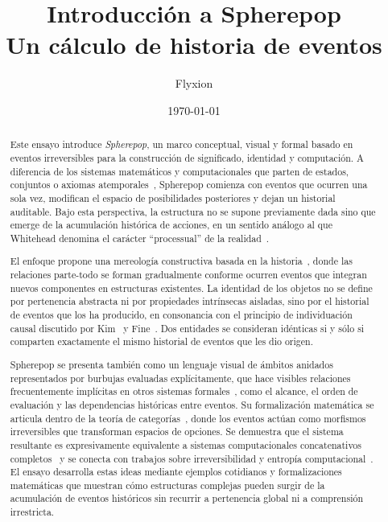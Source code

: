 \documentclass[12pt]{article}
\title{Introducción a Spherepop\\
\large Un cálculo de historia de eventos}
\author{Flyxion}
\date{\today}
\theoremstyle{plain}
\theoremstyle{definition}
\begin{document}
\maketitle
\thispagestyle{empty}

\begin{abstract}
\footnotesize
\noindent
Este ensayo introduce \emph{Spherepop}, un marco conceptual, visual y formal basado en eventos irreversibles para la construcción de significado, identidad y computación. A diferencia de los sistemas matemáticos y computacionales que parten de estados, conjuntos o axiomas atemporales~\cite{barendregt,homotopy}, Spherepop comienza con eventos que ocurren una sola vez, modifican el espacio de posibilidades posteriores y dejan un historial auditable. Bajo esta perspectiva, la estructura no se supone previamente dada sino que emerge de la acumulación histórica de acciones, en un sentido análogo al que Whitehead denomina el carácter ``processual'' de la realidad~\cite{whitehead}.

El enfoque propone una mereología constructiva basada en la historia~\cite{simons}, donde las relaciones parte-todo se forman gradualmente conforme ocurren eventos que integran nuevos componentes en estructuras existentes. La identidad de los objetos no se define por pertenencia abstracta ni por propiedades intrínsecas aisladas, sino por el historial de eventos que los ha producido, en consonancia con el principio de individuación causal discutido por Kim~\cite{kim} y Fine~\cite{fine}. Dos entidades se consideran idénticas si y sólo si comparten exactamente el mismo historial de eventos que les dio origen.

Spherepop se presenta también como un lenguaje visual de ámbitos anidados representados por burbujas evaluadas explícitamente, que hace visibles relaciones frecuentemente implícitas en otros sistemas formales~\cite{girard,abramsky}, como el alcance, el orden de evaluación y las dependencias históricas entre eventos. Su formalización matemática se articula dentro de la teoría de categorías~\cite{maclane,awodey}, donde los eventos actúan como morfismos irreversibles que transforman espacios de opciones. Se demuestra que el sistema resultante es expresivamente equivalente a sistemas computacionales concatenativos completos~\cite{moore} y se conecta con trabajos sobre irreversibilidad y entropía computacional~\cite{landauer,bennett}. El ensayo desarrolla estas ideas mediante ejemplos cotidianos y formalizaciones matemáticas que muestran cómo estructuras complejas pueden surgir de la acumulación de eventos históricos sin recurrir a pertenencia global ni a comprensión irrestricta.
\end{abstract}
\end{document}
